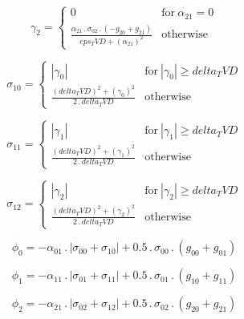 \documentclass{article}
\begin{document}
\begin{dmath}\gamma_{2} = \begin{cases} 0 & \text{for}\: \alpha_{21} = 0 \\\frac{\alpha_{21} \,.\, \sigma_{0 2} \,.\, \left(- g_{20} + g_{21}\right)}{eps_TVD + \left(\alpha_{21} \right)^{2}} & \text{otherwise} \end{cases}\end{dmath}

\begin{dmath}\sigma_{1 0} = \begin{cases} \left|{\gamma_{0}}\right| & \text{for}\: \left|{\gamma_{0}}\right| \geq delta_TVD \\\frac{\left(delta_TVD \right)^{2} + \left(\gamma_{0} \right)^{2}}{2 \,.\, delta_TVD} & \text{otherwise} 
\end{cases}\end{dmath}

\begin{dmath}\sigma_{1 1} = \begin{cases} \left|{\gamma_{1}}\right| & \text{for}\: \left|{\gamma_{1}}\right| \geq delta_TVD \\\frac{\left(delta_TVD \right)^{2} + \left(\gamma_{1} \right)^{2}}{2 \,.\, delta_TVD} & \text{otherwise} 
\end{cases}\end{dmath}

\begin{dmath}\sigma_{1 2} = \begin{cases} \left|{\gamma_{2}}\right| & \text{for}\: \left|{\gamma_{2}}\right| \geq delta_TVD \\\frac{\left(delta_TVD \right)^{2} + \left(\gamma_{2} \right)^{2}}{2 \,.\, delta_TVD} & \text{otherwise} 
\end{cases}\end{dmath}

\begin{dmath}\phi_{0} = - \alpha_{01} \,.\, \left|{\sigma_{0 0} + \sigma_{1 0}}\right| + 0.5 \,.\, \sigma_{0 0} \,.\, \left(g_{00} + g_{01}\right)\end{dmath}

\begin{dmath}\phi_{1} = - \alpha_{11} \,.\, \left|{\sigma_{0 1} + \sigma_{1 1}}\right| + 0.5 \,.\, \sigma_{0 1} \,.\, \left(g_{10} + g_{11}\right)\end{dmath}

\begin{dmath}\phi_{2} = - \alpha_{21} \,.\, \left|{\sigma_{0 2} + \sigma_{1 2}}\right| + 0.5 \,.\, \sigma_{0 2} \,.\, \left(g_{20} + g_{21}\right)\end{dmath}
\end{document}
